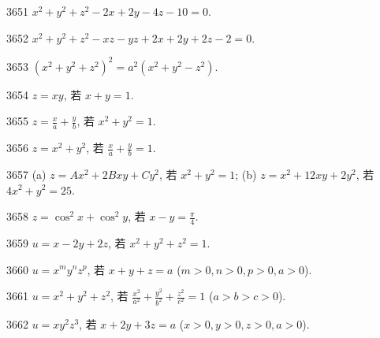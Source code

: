 
\begin{prob}[S]{3651}
$x^2 + y^2 + z^2 - 2x + 2y - 4z - 10 = 0$.
\end{prob}

\begin{prob}[S]{3652}
$x^2 + y^2 + z^2 - xz - yz + 2x + 2y + 2z - 2 = 0$.
\end{prob}

\begin{prob}[S]{3653}
$(x^2 + y^2 + z^2)^2 = a^2(x^2 + y^2 - z^2)$.
\end{prob}


\begin{prob}[S]{3654}
$z = xy$, 若 $x + y = 1$.
\end{prob}

\begin{prob}[S]{3655}
$z = \frac{x}{a} + \frac{y}{b}$, 若 $x^2 + y^2 = 1$.
\end{prob}

\begin{prob}[S]{3656}
$z = x^2 + y^2$, 若 $\frac{x}{a} + \frac{y}{b} = 1$.
\end{prob}

\begin{prob}[M]{3657}
(a) $z = Ax^2 + 2Bxy + Cy^2$, 若 $x^2 + y^2 = 1$; \qquad (b) $z = x^2 + 12xy + 2y^2$, 若 $4x^2 + y^2 = 25$.
\end{prob}

\begin{prob}[S]{3658}
$z = \cos^2 x + \cos^2 y$, 若 $x - y = \frac{\pi}{4}$.
\end{prob}

\begin{prob}[S]{3659}
$u = x - 2y + 2z$, 若 $x^2 + y^2 + z^2 = 1$.
\end{prob}

\begin{prob}[S]{3660}
$u = x^m y^n z^p$, 若 $x + y + z = a$ ($m > 0, n > 0, p > 0, a > 0$).
\end{prob}

\begin{prob}[S]{3661}
$u = x^2 + y^2 + z^2$, 若 $\frac{x^2}{a^2} + \frac{y^2}{b^2} + \frac{z^2}{c^2} = 1$ ($a > b > c > 0$).
\end{prob}

\begin{prob}[S]{3662}
$u = xy^2 z^3$, 若 $x + 2y + 3z = a$ ($x > 0, y > 0, z > 0, a > 0$).
\end{prob}

